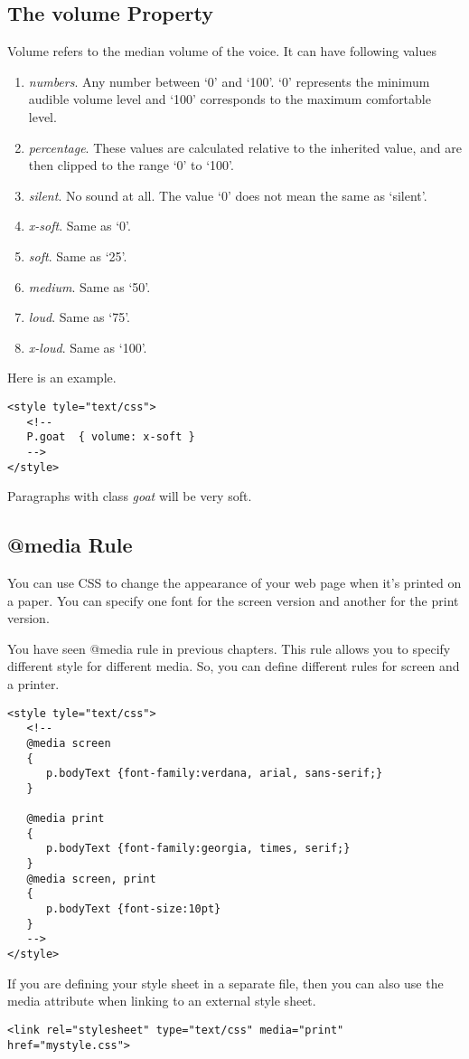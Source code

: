 \documentclass[a4paper,oneside]{book}
\numberwithin{equation}{chapter}
\begin{document}
\subsection{The volume Property}
Volume refers to the median volume of the voice. It can have following values
\begin{enumerate}
\item \textit{numbers}. Any number between `0' and `100'. `0' represents the minimum audible volume level and `100' corresponds to the maximum comfortable level.
\item \textit{percentage}. These values are calculated relative to the inherited value, and are then clipped to the range `0' to `100'.
\item \textit{silent}. No sound at all. The value `0' does not mean the same as `silent'.
\item \textit{x-soft}. Same as `0'.
\item \textit{soft}. Same as `25'.
\item \textit{medium}. Same as `50'.
\item \textit{loud}. Same as `75'.
\item \textit{x-loud}. Same as `100'.
\end{enumerate}
Here is an example.
\begin{verbatim}
<style tyle="text/css">
   <!--
   P.goat  { volume: x-soft }
   -->
</style>
\end{verbatim}
Paragraphs with class \textit{goat} will be very soft.
\subsection{@media Rule}
You can use CSS to change the appearance of your web page when it's printed on a paper. You can specify one font for the screen version and another for the print version.

You have seen @media rule in previous chapters. This rule allows you to specify different style for different media. So, you can define different rules for screen and a printer.
\begin{verbatim}
<style tyle="text/css">
   <!--
   @media screen
   {
      p.bodyText {font-family:verdana, arial, sans-serif;}
   }

   @media print
   {
      p.bodyText {font-family:georgia, times, serif;}
   }
   @media screen, print
   {
      p.bodyText {font-size:10pt}
   }
   -->
</style>
\end{verbatim}
If you are defining your style sheet in a separate file, then you can also use the media attribute when linking to an external style sheet.
\begin{verbatim}
<link rel="stylesheet" type="text/css" media="print" href="mystyle.css">
\end{verbatim}
\end{document}
